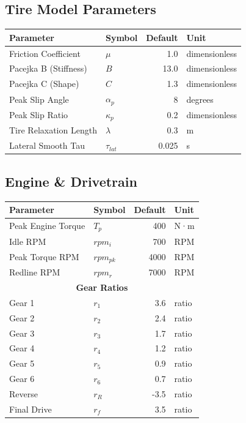 \subsection{Tire Model Parameters}

\begin{table}[H]
\centering
\begin{tabular}{|l|l|r|l|}
\hline
\textbf{Parameter} & \textbf{Symbol} & \textbf{Default} & \textbf{Unit} \\
\hline
Friction Coefficient & $\mu$ & 1.0 & dimensionless \\
Pacejka B (Stiffness) & $B$ & 13.0 & dimensionless \\
Pacejka C (Shape) & $C$ & 1.3 & dimensionless \\
Peak Slip Angle & $\alpha_p$ & 8 & degrees \\
Peak Slip Ratio & $\kappa_p$ & 0.2 & dimensionless \\
Tire Relaxation Length & $\lambda$ & 0.3 & m \\
Lateral Smooth Tau & $\tau_{lat}$ & 0.025 & s \\
\hline
\end{tabular}
\end{table}

\subsection{Engine \& Drivetrain}

\begin{table}[H]
\centering
\begin{tabular}{|l|l|r|l|}
\hline
\textbf{Parameter} & \textbf{Symbol} & \textbf{Default} & \textbf{Unit} \\
\hline
Peak Engine Torque & $T_p$ & 400 & N·m \\
Idle RPM & $rpm_i$ & 700 & RPM \\
Peak Torque RPM & $rpm_{pk}$ & 4000 & RPM \\
Redline RPM & $rpm_r$ & 7000 & RPM \\
\multicolumn{4}{|c|}{\textbf{Gear Ratios}} \\
Gear 1 & $r_1$ & 3.6 & ratio \\
Gear 2 & $r_2$ & 2.4 & ratio \\
Gear 3 & $r_3$ & 1.7 & ratio \\
Gear 4 & $r_4$ & 1.2 & ratio \\
Gear 5 & $r_5$ & 0.9 & ratio \\
Gear 6 & $r_6$ & 0.7 & ratio \\
Reverse & $r_R$ & -3.5 & ratio \\
Final Drive & $r_f$ & 3.5 & ratio \\
\hline
\end{tabular}
\end{table}

